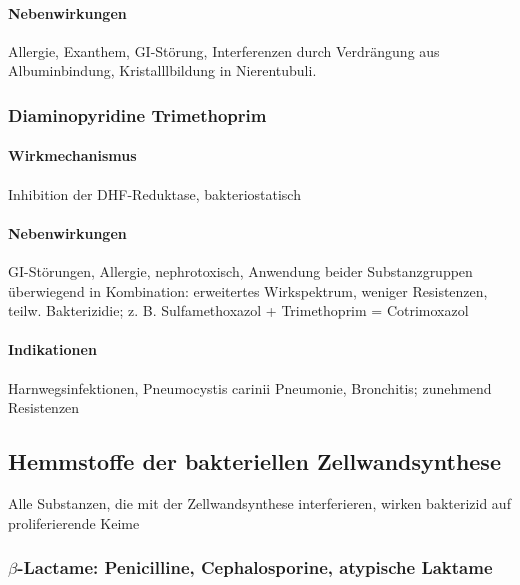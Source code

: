 \documentclass[10pt,a4paper]{report}
\begin{document}
\paragraph{Nebenwirkungen} %
\label{par:nebenwirkungen}
Allergie, Exanthem, GI-Störung, Interferenzen durch Verdrängung aus Albuminbindung, Kristalllbildung in Nierentubuli.
\subsubsection{Diaminopyridine Trimethoprim} %
\label{ssub:diaminopyridine}
\paragraph{Wirkmechanismus} %
\label{par:wirkmechanismus}
 Inhibition der DHF-Reduktase, bakteriostatisch
\paragraph{Nebenwirkungen} %
\label{par:nebenwirkungen}
GI-Störungen, Allergie, nephrotoxisch, Anwendung beider Substanzgruppen überwiegend in Kombination: erweitertes Wirkspektrum, weniger Resistenzen, teilw. Bakterizidie; z. B. Sulfamethoxazol + Trimethoprim = Cotrimoxazol
\paragraph{Indikationen} %
\label{par:indikationen}
Harnwegsinfektionen, Pneumocystis carinii Pneumonie, Bronchitis; zunehmend Resistenzen
\subsection{Hemmstoffe der bakteriellen Zellwandsynthese} %
\label{sub:hemmstoffe_der_bakteriellen_zellwandsynthese}
Alle Substanzen, die mit der Zellwandsynthese interferieren, wirken bakterizid auf proliferierende Keime 
\subsubsection{$\beta$-Lactame: Penicilline, Cephalosporine, atypische Laktame} %
\label{ssub:subsubsection_name}
\end{document}

